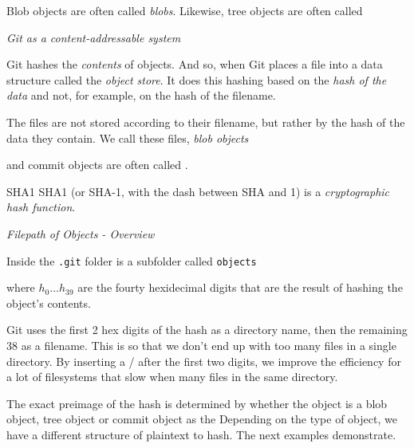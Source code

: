 Blob objects are often called \textit{blobs}. 
Likewise, tree objects are often called  


\frmrule 

\textit{Git as a content-addressable system}



Git hashes the \textit{contents} of objects. 
And so, when Git
places a file into a data structure called the \textit{object store}. 
It does this hashing based on the \textit{hash of the data} and not,
for example, on the hash of the filename. 

The files are not stored according to their filename, 
but rather by the hash of the data they contain. 
We call these files, \textit{blob objects}


and commit objects are often called . 

\begin{sidenote}{SHA1}
SHA1 (or SHA-1, with the dash between SHA and 1) is a \textit{cryptographic hash function}. 
\end{sidenote}





\frmrule 

\textit{Filepath of Objects - Overview}

Inside the \lstinline{.git} folder is a 
subfolder called \lstinline{objects}



where $h_0...h_{39}$ are the fourty hexidecimal digits 
that are the result of hashing the object's contents. 

Git uses the first 2 hex digits of the hash as a directory name, then the remaining 38 as a filename. 
This is so that we don't end up with too many files in a single directory. 
By inserting a / after the first two digits, we improve the efficiency for a lot of filesystems
that slow when many files in the same directory. 

The exact preimage of the hash is determined by whether 
the object is a blob object, tree object or commit object as the 
Depending on the type of object, we 
have a different structure of plaintext to hash.
The next examples demonstrate.  

\frmrule 

